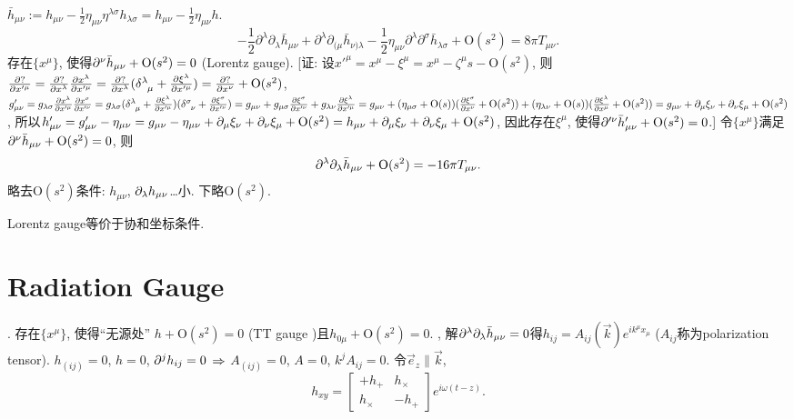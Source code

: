 $\bar{h}_{\mu\nu}:=h_{\mu\nu}-\frac{1}{2}\eta_{\mu\nu}\eta^{\lambda\sigma}h_{\lambda\sigma}=h_{\mu\nu}-\frac{1}{2}\eta_{\mu\nu}h$.
\begin{equation}
    -\frac{1}{2} \partial^{\lambda} \partial_{\lambda} \bar{h}_{\mu \nu}+\partial^{\lambda} \partial_{(\mu} \bar{h}_{\nu) \lambda}-\frac{1}{2} \eta_{\mu \nu} \partial^{\lambda} \partial^{\sigma} \bar{h}_{\lambda \sigma}+\text{O}(s^2)=8 \pi T_{\mu \nu}.
\end{equation}
存在$\{x^{\mu}\}$, 使得$\partial^{\nu}\bar{h}_{\mu\nu}+\text{O}(s^2)=0$ (Lorentz gauge). [证: 设$x'^\mu=x^\mu-\xi^\mu=x^\mu-\zeta^\mu s-\text{O}(s^2)$, 则$\frac{\p ?}{\p x'^\mu}=\frac{\p ?}{\p x^\lambda}\frac{\p x^\lambda}{\p x'^\mu}=\frac{\p ?}{\p x^\lambda}(\delta^{\lambda}_{\ph{\lambda}\mu}+\frac{\p \xi^\lambda}{\p x'^\mu})=\frac{\p ?}{\p x^\nu}+\text{O}(s^2)$, $g'_{\mu\nu}=g_{\lambda\sigma}\frac{\p x^\lambda}{\p x'^\mu}\frac{\p x^\sigma}{\p x'^\nu}=g_{\lambda\sigma}(\delta^{\lambda}_{\ph{\lambda}\mu}+\frac{\p \xi^\lambda}{\p x'^\mu})(\delta^{\sigma}_{\ph{\sigma}\nu}+\frac{\p \xi^\sigma}{\p x'^\nu})=g_{\mu\nu}+g_{\mu\sigma}\frac{\p \xi^\sigma}{\p x'^\nu}+g_{\lambda\nu}\frac{\p \xi^\lambda}{\p x'^\mu}=g_{\mu\nu}+(\eta_{\mu\sigma}+\text{O}(s))(\frac{\p \xi^\sigma}{\p x^\nu}+\text{O}(s^2))+(\eta_{\lambda\nu}+\text{O}(s))(\frac{\p \xi^\lambda}{\p x^\mu}+\text{O}(s^2))=g_{\mu\nu}+\p_\mu\xi_\nu+\p_\nu\xi_\mu+\text{O}(s^2)$, 所以$h'_{\mu\nu}=g'_{\mu\nu}-\eta_{\mu\nu}=g_{\mu\nu}-\eta_{\mu\nu}+\partial_\mu\xi_\nu+\partial_\nu\xi_\mu+\text{O}(s^2)=h_{\mu\nu}+\partial_\mu\xi_\nu+\partial_\nu\xi_\mu+\text{O}(s^2)$, 因此存在$\xi^\mu$, 使得$\partial'^{\nu}\bar{h}'_{\mu\nu}+\text{O}(s^2)=0$.] 令$\{x^{\mu}\}$满足$\partial^{\nu}\bar{h}_{\mu\nu}+\text{O}(s^2)=0$, 则
\begin{equation}
    \partial^{\lambda}\partial_{\lambda}\bar{h}_{\mu\nu}+\text{O}(s^2)=-16\pi T_{\mu \nu}.\label{lin_gravity}
\end{equation}
略去$\text{O}(s^2)$条件: $h_{\mu\nu}$, $\partial_\lambda h_{\mu\nu}$\dots{}小. 下略$\text{O}(s^2)$.

Lorentz gauge等价于协和坐标条件.

\section{Radiation Gauge}

\cite{Wald1984}. 存在$\{x^{\mu}\}$, 使得``无源处'' $h+\text{O}(s^2)=0$ (TT gauge \cite{Wang2020})且$h_{0\mu}+\text{O}(s^2)=0$. \cite{Maggiore2014}, 解$\partial^{\lambda}\partial_{\lambda}\bar{h}_{\mu\nu}=0$得$h_{ij}=A_{ij}(\vec{k})e^{ik^\mu x_\mu}$ ($A_{ij}$称为polarization tensor). $h_{(ij)}=0$, $h=0$, $\partial^{j}h_{ij}=0$ $\Rightarrow$ $A_{(ij)}=0$, $A=0$, $k^{j}A_{ij}=0$. 令$\vec{e}_z\parallel\vec{k}$,
\begin{equation}
    h_{xy}=\begin{bmatrix}
        +h_+&h_\times\\
        h_\times&-h_+
    \end{bmatrix}e^{i\omega(t-z)}.
\end{equation}

